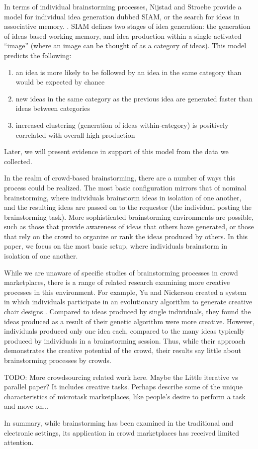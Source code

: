 In terms of individual brainstorming processes, Nijstad and Stroebe provide a model for individual idea generation dubbed SIAM, or the search for ideas in associative memory. \cite{nijstad_how_2006}. SIAM defines two stages of idea generation: the generation of ideas based working memory, and idea production within a single activated ``image'' (where an image can be thought of as a category of ideas). This model predicts the following:

\begin{enumerate}
\item an idea is more likely to be followed by an idea in the same category than would be expected by chance
\item new ideas in the same category as the previous idea are generated faster than ideas between categories
\item increased clustering (generation of ideas within-category) is positively correlated with overall high production
\end{enumerate}

Later, we will present evidence in support of this model from the data we collected.

In the realm of crowd-based brainstorming, there are a number of ways this process could be realized. The most basic configuration mirrors that of nominal brainstorming, where individuals brainstorm ideas in isolation of one another, and the resulting ideas are passed on to the requestor (the individual posting the brainstorming task). More sophisticated brainstorming environments are possible, such as those that provide awareness of ideas that others have generated, or those that rely on the crowd to organize or rank the ideas produced by others. In this paper, we focus on the most basic setup, where individuals brainstorm in isolation of one another.

While we are unaware of specific studies of brainstorming processes in crowd marketplaces, there is a range of related research examining more creative processes in this environment. For example, Yu and Nickerson created a system in which individuals participate in an evolutionary algorithm to generate creative chair designs \cite{yu_cooks_2011}. Compared to ideas produced by single individuals, they found the ideas produced as a result of their genetic algorithm were more creative. However, individuals produced only one idea each, compared to the many ideas typically produced by individuals in a brainstorming session. Thus, while their approach demonstrates the creative potential of the crowd, their results say little about brainstorming processes by crowds.



TODO: More crowdsourcing related work here. Maybe the Little iterative vs parallel paper? It includes creative tasks. Perhaps describe some of the unique characteristics of microtask marketplaces, like people's desire to perform a task and move on...

In summary, while brainstorming has been examined in the traditional and electronic settings, its application in crowd marketplaces has received limited attention. 